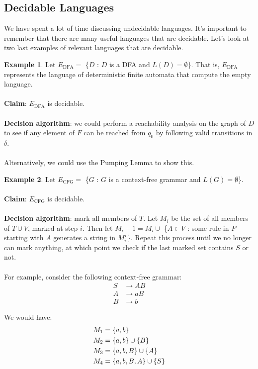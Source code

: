 \documentclass[]{article}
\DeclarePairedDelimiter{\set}{\lbrace}{\rbrace}
\theoremstyle{definition}
\newtheorem{ex}{Example}[section]
\begin{document}
    \subsection{Decidable Languages}
      We have spent a lot of time discussing undecidable languages. It's important to remember that there are many useful languages that are decidable. Let's look at two last examples of relevant languages that are decidable.

      \begin{ex}
        Let $E_\text{DFA} = $ \{$D$ : $D$ is a DFA and $L(D) = \emptyset$\}. That is, $E_\text{DFA}$ represents the language of deterministic finite automata that compute the empty language.
        \\ \\
        \textbf{Claim}: $E_\text{DFA}$ is decidable.
        \\ \\
        \textbf{Decision algorithm}: we could perform a reachability analysis on the graph of $D$ to see if any element of $F$ can be reached from $q_0$ by following valid transitions in $\delta$.
        \\ \\
        Alternatively, we could use the Pumping Lemma to show this.
      \end{ex}

      \begin{ex}
        Let $E_\text{CFG} = $ \{$G$ : $G$ is a context-free grammar and $L(G) = \emptyset$\}.
        \\ \\
        \textbf{Claim}: $E_\text{CFG}$ is decidable.
        \\ \\
        \textbf{Decision algorithm}: mark all members of $T$. Let $M_i$ be the set of all members of $T \cup V$, marked at step $i$. Then let $M_i + 1 = M_i \cup $ \{$A \in V$ : some rule in $P$ starting with $A$ generates a string in $M_i^\star$\}. Repeat this process until we no longer can mark anything, at which point we check if the last marked set contains $S$ or not.
        \\ \\
        For example, consider the following context-free grammar:
        \begin{align*}
          S &\to AB \\
          A &\to aB \\
          B &\to b
        \end{align*}

        We would have:
        \begin{align*}
          M_1 &= \set{a, b} \\
          M_2 &= \set{a, b} \cup \set{B} \\
          M_3 &= \set{a, b, B} \cup \set{A} \\
          M_4 &= \set{a, b, B, A} \cup \set{S}
        \end{align*}
      \end{ex}
\end{document}

